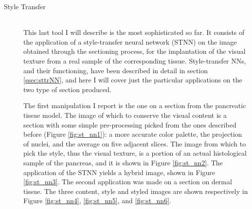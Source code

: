 \begin{description}
        \item [Style Transfer] \hfill \\
        This last tool I will describe is the most sophisticated so far. It consists of the application of a style-transfer neural network (STNN) on the image obtained through the sectioning process, for the implantation of the visual texture from a real sample of the corresponding tissue. Style-transfer NNs, and their functioning, have been described in detail in section \ref{ssec:sttrNN}, and here I will cover just the particular applications on the two type of section produced.

        The first manipulation I report is the one on a section from the pancreatic tissue model. The image of which to conserve the visual content is a section with some simple pre-processing picked from the ones described before (Figure \ref{fig:st_nn1}): a more accurate color palette, the projection of nuclei, and the average on five adjacent slices. The image from which to pick the style, thus the visual texture, is a portion of an actual histological sample of the pancreas, and it is shown in Figure \ref{fig:st_nn2}. The application of the STNN yields a hybrid image, shown in Figure \ref{fig:st_nn3}. The second application was made on a section on dermal tissue. The three content, style and styled images are shown respectively in Figure \ref{fig:st_nn4}, \ref{fig:st_nn5}, and \ref{fig:st_nn6}.


\end{description}
